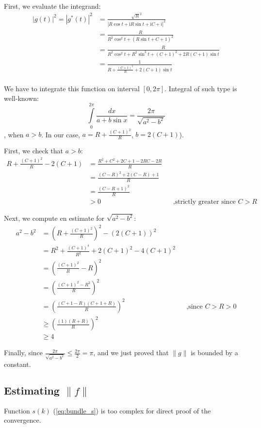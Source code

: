 \documentclass{gCOV2e}
\theoremstyle{plain}%
\theoremstyle{definition}
\theoremstyle{remark}
\begin{document}
First, we evaluate the integrand:
\begin{align*}
\left|g(t)\right|^2 = \left|g^*(t)\right|^2
&=   \frac{\sqrt{R}^2}{\left|R \cos t + \mathrm{i} R \sin t + \mathrm{i} C + i\right|^2} \\
&=   \frac{R}{R^2 \cos^2 t + (R \sin t + C + 1)^2} \\
&= \frac{R}{R^2 \cos^2 t + R^2 \sin^2 t + (C + 1)^2  + 2 R (C + 1) \sin t} \\
&=   \frac{1}{R + \frac{(C + 1)^2}{R} + 2 (C + 1) \sin t} \\ 
\end{align*}

We have to integrate this function on interval $[0, 2 \pi]$. Integral of such type is well-known: %
\[
\int\limits_{0}^{2 \pi} \frac{dx}{a + b \sin x} = \frac{2 \pi}{\sqrt{a^2 - b^2}}
\]
, when $a > b$. In our case, $a = R + \frac{(C + 1)^2}{R}$, $b = 2 (C + 1)$).

First, we check that $a > b$:
\begin{align*}
   R + \frac{(C + 1)^2}{R} - 2 (C + 1)
   &= \frac{R^2 + C^2 + 2C + 1 - 2 RC - 2 R}{R}
\\ &= \frac{(C - R)^2 + 2(C - R) + 1}{R}
\\ &= \frac{(C - R + 1)^2 }{R}
\\ &> 0 && \text{,strictly greater since $C > R$} 
\end{align*}

Next, we compute en estimate for $\sqrt{a^2 - b^2}$:
\begin{align*}
a^2 - b^2
& =  (R + \frac{(C + 1)^2}{R})^2 - (2 (C + 1))^2\\
& =  R^2 + \frac{(C+1)^4}{R^2} + 2 (C+1)^2 - 4 (C + 1)^2 \\
& =  \left( \frac{(C + 1)^2}{R} - R \right)^2 \\
& =  \left( \frac{(C + 1)^2 - R^2}{R}\right)^2 \\
& =  \left( \frac{(C + 1 - R) (C + 1 + R)}{R}\right)^2 && \text{,since $C > R > 0$} \\
&\ge \left( \frac{(1) (R + R)}{R}\right)^2  \\
&\ge 4
\end{align*}

Finally, since $\frac{2 \pi}{\sqrt{a^2 - b^2}} \le \frac{2 \pi}{2} = \pi$, and we just proved that $\|g\|$ is bounded by a constant. 


\subsection{Estimating $\|f\|$}
Function $s(k)$ (\ref{eq:bundle_s}) is too complex for direct proof of the convergence.
\end{document}
